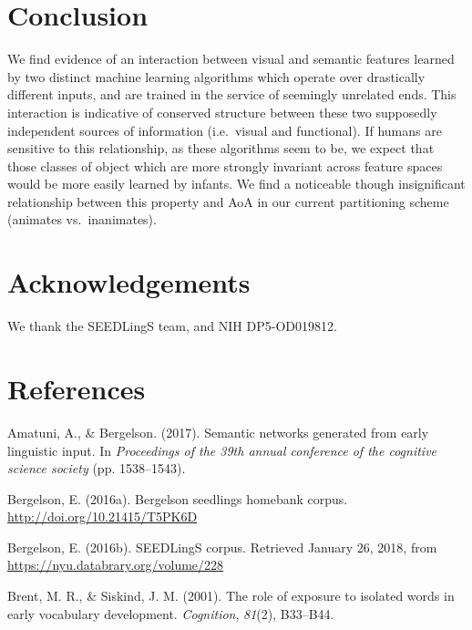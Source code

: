 \documentclass[10pt, letterpaper]{article}
\begin{document}
\section{Conclusion}\label{conclusion}

We find evidence of an interaction between visual and semantic features
learned by two distinct machine learning algorithms which operate over
drastically different inputs, and are trained in the service of
seemingly unrelated ends. This interaction is indicative of conserved
structure between these two supposedly independent sources of
information (i.e.~visual and functional). If humans are sensitive to
this relationship, as these algorithms seem to be, we expect that those
classes of object which are more strongly invariant across feature
spaces would be more easily learned by infants. We find a noticeable
though insignificant relationship between this property and AoA in our
current partitioning scheme (animates vs.~inanimates).

\section{Acknowledgements}\label{acknowledgements}

We thank the SEEDLingS team, and NIH DP5-OD019812.

\section{References}\label{references}

\setlength{\parindent}{-0.1in} \setlength{\leftskip}{0.125in} \noindent

\hypertarget{refs}{}
\hypertarget{ref-amatuni2017semantic}{}
Amatuni, A., \& Bergelson. (2017). Semantic networks generated from
early linguistic input. In \emph{Proceedings of the 39th annual
conference of the cognitive science society} (pp. 1538--1543).

\hypertarget{ref-bergelson2016seedlings}{}
Bergelson, E. (2016a). Bergelson seedlings homebank corpus.
\url{http://doi.org/10.21415/T5PK6D}

\hypertarget{ref-bergelson2016seedlingsdatabrary}{}
Bergelson, E. (2016b). SEEDLingS corpus. Retrieved January 26, 2018,
from \url{https://nyu.databrary.org/volume/228}

\hypertarget{ref-brent2001role}{}
Brent, M. R., \& Siskind, J. M. (2001). The role of exposure to isolated
words in early vocabulary development. \emph{Cognition}, \emph{81}(2),
B33--B44.
\end{document}
